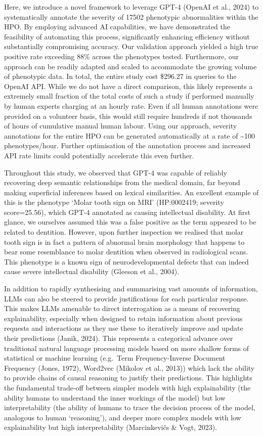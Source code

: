 \documentclass[
]{agujournal2019}
\begin{document}
Here, we introduce a novel framework to leverage GPT-4 (OpenAI et al.,
2024) to systematically annotate the severity of 17502 phenotypic
abnormalities within the HPO. By employing advanced AI capabilities, we
have demonstrated the feasibility of automating this process,
significantly enhancing efficiency without substantially compromising
accuracy. Our validation approach yielded a high true positive rate
exceeding 88\% across the phenotypes tested. Furthermore, our approach
can be readily adapted and scaled to accommodate the growing volume of
phenotypic data. In total, the entire study cost \$296.27 in queries to
the OpenAI API. While we do not have a direct comparison, this likely
represents a extremely small fraction of the total costs of such a study
if performed manually by human experts charging at an hourly rate. Even
if all human annotations were provided on a volunteer basis, this would
still require hundreds if not thousands of hours of cumulative manual
human labour. Using our approach, severity annotations for the entire
HPO can be generated automatically at a rate of \textasciitilde100
phenotypes/hour. Further optimisation of the annotation process and
increased API rate limits could potentially accelerate this even
further.

Throughout this study, we observed that GPT-4 was capable of reliably
recovering deep semantic relationships from the medical domain, far
beyond making superficial inferences based on lexical similarities. An
excellent example of this is the phenotype `Molar tooth sign on MRI'
(HP:0002419; severity score=25.56), which GPT-4 annotated as causing
intellectual disability. At first glance, we ourselves assumed this was
a false positive as the term appeared to be related to dentition.
However, upon further inspection we realised that molar tooth sign is in
fact a pattern of abnormal brain morphology that happens to bear some
resemblance to molar dentition when observed in radiological scans. This
phenotype is a known sign of neurodevelopmental defects that can indeed
cause severe intellectual disability (Gleeson et al., 2004).

In addition to rapidly synthesising and summarising vast amounts of
information, LLMs can also be steered to provide justifications for each
particular response. This makes LLMs amenable to direct interrogation as
a means of recovering explainability, especially when designed to retain
information about previous requests and interactions as they use these
to iteratively improve and update their predictions (Janik, 2024). This
represents a categorical advance over traditional natural language
processing models based on more shallow forms of statistical or machine
learning (e.g.~Term Frequency-Inverse Document Frequency (Jones, 1972),
Word2vec (Mikolov et al., 2013)) which lack the ability to provide
chains of causal reasoning to justify their predictions. This highlights
the fundamental trade-off between simpler models with high
explainability (the ability humans to understand the inner workings of
the model) but low interpretability (the ability of humans to trace the
decision process of the model, analogous to human `reasoning'), and
deeper more complex models with low explainability but high
interpretability (Marcinkevičs \& Vogt, 2023).
\end{document}
